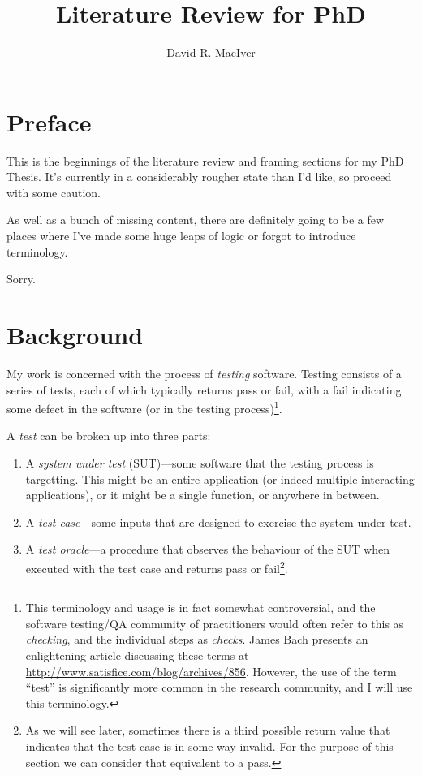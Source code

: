 

\title{Literature Review for PhD}
\author{David R. MacIver}



\maketitle

\tableofcontents

\chapter*{Preface}

This is the beginnings of the literature review and framing sections for my PhD Thesis.
It's currently in a considerably rougher state than I'd like,
so proceed with some caution.

As well as a bunch of missing content,
there are definitely going to be a few places where I've made some huge leaps of logic or forgot to introduce terminology.

Sorry.

\chapter{Background}\label{chap:introduction}

My work is concerned with the process of \emph{testing} software.
Testing consists of a series of tests,
each of which typically returns pass or fail,
with a fail indicating some defect in the software (or in the testing process)\footnote{
This terminology and usage is in fact somewhat controversial,
and the software testing/QA community of practitioners would often refer to this as \emph{checking},
and the individual steps as \emph{checks}.
James Bach presents an enlightening article discussing these terms at \url{http://www.satisfice.com/blog/archives/856}.
However,
the use of the term ``test'' is significantly more common in the research community,
and I will use this terminology.
}.

A \emph{test} can be broken up into three parts:

\begin{enumerate}
\item A \emph{system under test} (SUT)---some software that the testing process is targetting.
This might be an entire application (or indeed multiple interacting applications),
or it might be a single function,
or anywhere in between.
\item A \emph{test case}---some
inputs that are designed to exercise the system under test.
\item A \emph{test oracle}---a
procedure that observes the behaviour of the SUT when executed with the test case and returns pass or fail\footnote{
As we will see later, sometimes there is a third possible return value that indicates that the test case is in some way invalid.
For the purpose of this section we can consider that equivalent to a pass.
}.
\end{enumerate}

